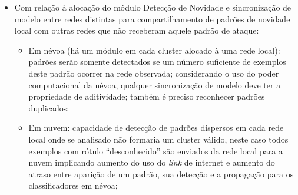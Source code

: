 \begin{itemize}
  
  \item Com relação à alocação do módulo Detecção de Novidade e sincronização de
  modelo entre redes distintas para compartilhamento de padrões de novidade local
  com outras redes que não receberam aquele padrão de ataque:
  \begin{itemize}
    
    \item Em névoa (há um módulo em cada cluster alocado à uma rede local): padrões serão
    somente detectados se um número suficiente de exemplos deste padrão ocorrer
    na rede observada; considerando o uso do poder computacional da névoa, qualquer
    sincronização de modelo deve ter a propriedade de aditividade; também é preciso  reconhecer padrões duplicados;

    \item Em nuvem: capacidade de detecção de padrões dispersos em cada rede
    local onde se analisado não formaria um cluster válido,
    neste caso todos exemplos com rótulo ``desconhecido''  são enviados da rede
    local para a nuvem implicando aumento do uso do \emph{link} de internet e
    aumento do atraso entre aparição de um padrão, sua detecção e a propagação
    para os classificadores em névoa;


\end{itemize}
\end{itemize}
